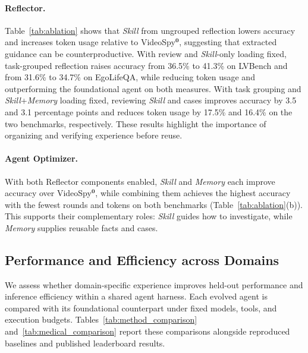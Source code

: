 \documentclass{article} %
\begin{document}
\VideoSpyAblationTable
\VideoSpyComparisonTable


\paragraph{Reflector.}
Table~\ref{tab:ablation} shows that \textit{Skill} from ungrouped reflection lowers accuracy and increases token usage relative to VideoSpy$^{\mathbf{0}}$, suggesting that extracted guidance can be counterproductive. With review and \textit{Skill}-only loading fixed, task-grouped reflection raises accuracy from 36.5\% to 41.3\% on LVBench and from 31.6\% to 34.7\% on EgoLifeQA, while reducing token usage and outperforming the foundational agent on both measures. With task grouping and \textit{Skill}+\textit{Memory} loading fixed, reviewing \textit{Skill} and cases improves accuracy by 3.5 and 3.1 percentage points and reduces token usage by 17.5\% and 16.4\% on the two benchmarks, respectively. These results highlight the importance of organizing and verifying experience before reuse.

\paragraph{Agent Optimizer.}
With both Reflector components enabled, \textit{Skill} and \textit{Memory} each improve accuracy over VideoSpy$^{\mathbf{0}}$, while combining them achieves the highest accuracy with the fewest rounds and tokens on both benchmarks (Table~\ref{tab:ablation}(b)). This supports their complementary roles: \textit{Skill} guides how to investigate, while \textit{Memory} supplies reusable facts and cases.

\subsection{Performance and Efficiency across Domains}
\label{sec:performance}

We assess whether domain-specific experience improves held-out performance and inference efficiency within a shared agent harness. Each evolved agent is compared with its foundational counterpart under fixed models, tools, and execution budgets. Tables~\ref{tab:method_comparison} and~\ref{tab:medical_comparison} report these comparisons alongside reproduced baselines and published leaderboard results.

\VideoSpyMedicalTable
\end{document}
